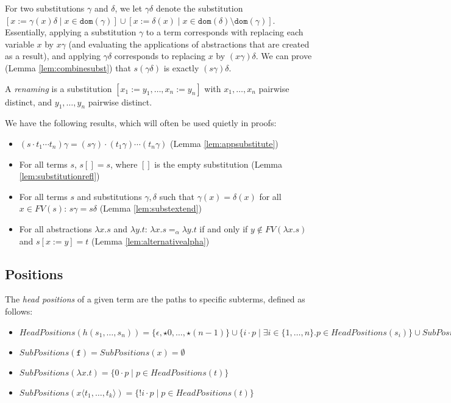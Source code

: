 \documentclass{lmcs}
\theoremstyle{theorem}\newtheorem{theorem}{Theorem}
\theoremstyle{theorem}\newtheorem{lemma}[theorem]{Lemma}
\theoremstyle{theorem}\newtheorem{corollary}[theorem]{Corollary}
\theoremstyle{definition}\newtheorem{definition}[theorem]{Definition}
\theoremstyle{definition}\newtheorem{example}[theorem]{Example}
\newcommand{\FV}{\mathit{FV}}
\newcommand{\SubPositions}{\mathit{SubPositions}}
\newcommand{\HeadPositions}{\mathit{HeadPositions}}
\newcommand{\domain}{\mathtt{dom}}
\newcommand{\identifier}[1]{\mathtt{#1}}
\newcommand{\afun}{\identifier{f}}
\newcommand{\avar}{x}
\newcommand{\bvar}{y}
\newcommand{\abs}[2]{\lambda #1.#2}
\newcommand{\meta}[2]{#1\langle#2\rangle}
\begin{document}
For two substitutions $\gamma$ and $\delta$, we let $\gamma\delta$ denote the substitution
$[\avar := \gamma(\avar)\delta \mid \avar \in \domain(\gamma)] \cup
[\avar := \delta(\avar) \mid \avar \in \domain(\delta) \setminus \domain(\gamma)]$.
Essentially, applying a substitution $\gamma$ to a term corresponds with replacing each variable
$\avar$ by $\avar\gamma$ (and evaluating the applications of abstractions that are created as a
result), and applying $\gamma\delta$ corresponds to replacing $\avar$ by $(\avar\gamma)\delta$.
We can prove (Lemma \ref{lem:combinesubst}) that $s(\gamma\delta)$ is exactly $(s\gamma)\delta$.

A \emph{renaming} is a substitution $[x_1:=y_1,\dots,x_n:=y_n]$ with $x_1,\dots,x_n$ pairwise
distinct, and $y_1,\dots,y_n$ pairwise distinct.

We have the following results, which will often be used quietly in proofs:
\begin{itemize}
\item $(s \cdot t_1 \cdots t_n)\gamma = (s\gamma) \cdot (t_1\gamma) \cdots (t_n\gamma)$
  (Lemma \ref{lem:appsubstitute})
\item For all terms $s$, $s[] = s$, where $[]$ is the empty substitution
  (Lemma \ref{lem:substitutionrefl})
\item For all terms $s$ and substitutions $\gamma,\delta$ such that $\gamma(\avar) = \delta(\avar)$
  for all $\avar \in \FV(s)$: $s\gamma = s\delta$ (Lemma \ref{lem:substextend})
\item For all abstractions $\abs{\avar}{s}$ and $\abs{\bvar}{t}$:
  $\abs{\avar}{s} =_\alpha \abs{\bvar}{t}$ if and only if $\bvar \notin \FV(\abs{\avar}{s})$ and
  $s[\avar:=\bvar] = t$ (Lemma \ref{lem:alternativealpha})
\end{itemize}

\subsection{Positions}

The \emph{head positions} of a given term are the paths to specific subterms, defined as follows:

\begin{itemize}
\item $\HeadPositions(h(s_1,\dots,s_n)) = \{ \epsilon, \star 0, \dots, \star (n-1) \} \cup
  \{ i \cdot p \mid \exists i \in \{1,\dots,n\}. p \in \HeadPositions(s_i) \} \cup
  \SubPositions(h)$
\item $\SubPositions(\afun) = \SubPositions(\avar) = \emptyset$
\item $\SubPositions(\abs{\avar}{t}) = \{ 0 \cdot p \mid p \in \HeadPositions(t) \}$
\item $\SubPositions(\meta{\avar}{t_1,\dots,t_k}) = \{ !i \cdot p \mid p \in
  \HeadPositions(t) \}$
\end{itemize}
\end{document}
